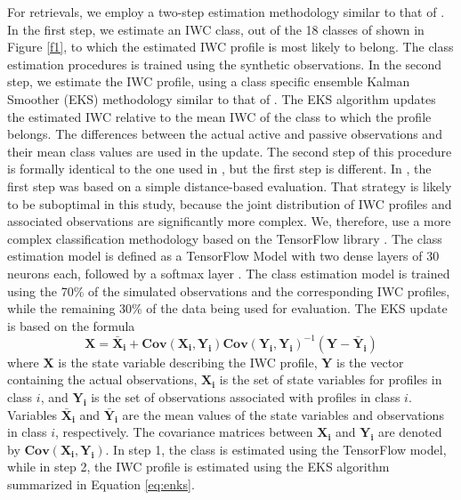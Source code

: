 \documentclass{ametsocV6.1}
\begin{document}
For retrievals, we employ a two-step estimation methodology similar to that of \cite{grecu2018}.  In the first step, we 
estimate an IWC class, out of the 18 classes of shown in Figure \ref{f1},
to which the estimated IWC profile is most likely to belong. The class estimation procedures is 
trained using the synthetic observations.
In the second step, we estimate the IWC profile,
using a class specific ensemble Kalman Smoother (EKS) methodology similar to that of \cite{grecu2018}.  
The EKS algorithm updates the estimated IWC relative to the mean IWC of the class to which the profile belongs.
The differences between the actual active and passive observations and their mean class values are used
in the update. The 
second step of this procedure is formally identical to the one used in \cite{grecu2018}, but the first step is
different. In \cite{grecu2018}, the first step was based on a simple distance-based evaluation. That strategy
is likely to be suboptimal in this study, because the joint distribution of IWC profiles and associated
observations are significantly more complex. We, therefore, use a more complex classification methodology
based on the TensorFlow library \citep{tensorflow2016}. The class estimation model is defined as a
TensorFlow Model with two dense layers of 30 neurons each, followed by a softmax layer \citep{deepL2016}. The 
class estimation model is trained using the 70\% of the simulated observations and the corresponding IWC 
profiles, while the remaining 30\% of the data being used for evaluation. 
The EKS update is based on the formula%
\begin{equation}
    \mathbf{X}=\mathbf{\bar{X}_i}+\mathbf{Cov(X_i,Y_i)}\mathbf{Cov(Y_i,Y_i)}^{-1}(\mathbf{Y}-\mathbf{\bar{Y}_i}) \label{eq:enks}
\end{equation}
where $\mathbf{X}$ is the state variable describing the IWC profile, $\mathbf{Y}$ is the vector containing
the actual observations, $\mathbf{X_i}$ is the set of state variables for profiles
in class $i$, and $\mathbf{Y_i}$ is the
set of observations associated with profiles in class $i$.  Variables $\mathbf{\bar{X}_i}$ and $\mathbf{\bar{Y}_i}$ are the mean values
of the state variables and observations in class $i$, respectively. The covariance matrices between 
$\mathbf{X_i}$ and $\mathbf{Y_i}$ are denoted by $\mathbf{Cov(X_i,Y_i)}$. In step 1, the class is estimated
using the TensorFlow model, while in step 2, the IWC profile is estimated using the EKS algorithm summarized in 
Equation \ref{eq:enks}.
\end{document}
